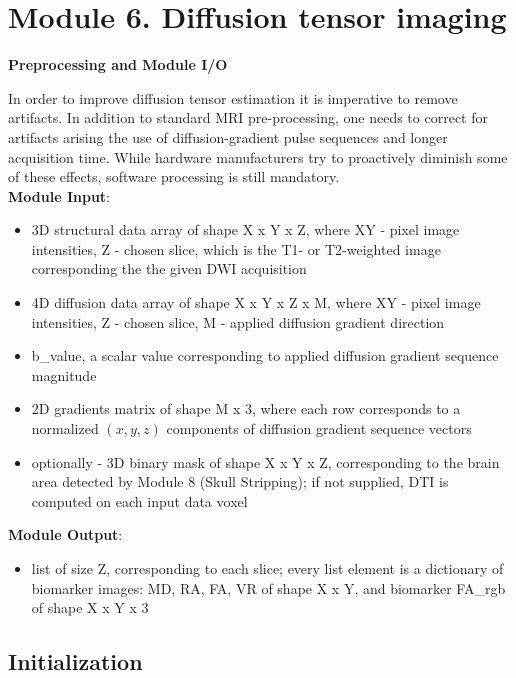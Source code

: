 \section{Module 6. Diffusion tensor imaging}

\textbf{Preprocessing and Module I/O}

In order to improve diffusion tensor estimation it is imperative to
remove artifacts. In addition to standard MRI pre-processing, one
needs to correct for artifacts arising the use of diffusion-gradient
pulse sequences and longer acquisition time. While hardware manufacturers
try to proactively diminish some of these effects, software processing
is still mandatory. 
\hfill\\

\textbf{Module Input}:
\begin{itemize}
	\item 
	3D structural data array of shape X x Y x Z, where XY - pixel image intensities, Z - chosen slice, which is the T1- or T2-weighted image corresponding the the given DWI acquisition
	
	\item 
	4D diffusion data array of shape X x Y x Z x M, where XY - pixel image intensities, Z - chosen slice, M - applied diffusion gradient direction
	
	\item 
	b\_value, a scalar value corresponding to applied diffusion gradient sequence magnitude
	
	\item 
	2D gradients matrix of shape M x 3, where each row corresponds to a normalized $(x,y,z)$ components of diffusion gradient sequence vectors
		
	\item 
	optionally - 3D binary mask of shape X x Y x Z, corresponding to the brain area detected by Module 8 (Skull Stripping); if not supplied, DTI is computed on each input data voxel

\end{itemize}
\hfill

\textbf{Module Output}:
\begin{itemize}
	\item
	list of size Z, corresponding to each slice; every list element is a dictionary of biomarker images: MD, RA, FA, VR of shape X x Y, and biomarker FA\_rgb of shape X x Y x 3
\end{itemize}

\subsection{Initialization}

